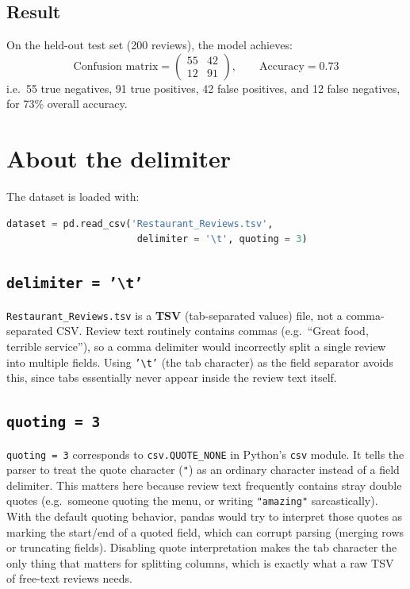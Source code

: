 \documentclass[11pt]{article}
\begin{document}
\subsection{Result}
On the held-out test set (200 reviews), the model achieves:
\[
  \text{Confusion matrix} =
  \begin{pmatrix} 55 & 42 \\ 12 & 91 \end{pmatrix},
  \qquad \text{Accuracy} = 0.73
\]
i.e.\ 55 true negatives, 91 true positives, 42 false positives, and
12 false negatives, for 73\% overall accuracy.

\section{About the delimiter}

The dataset is loaded with:
\begin{lstlisting}[language=Python]
dataset = pd.read_csv('Restaurant_Reviews.tsv',
                       delimiter = '\t', quoting = 3)
\end{lstlisting}

\subsection{\texttt{delimiter = '\textbackslash t'}}
\texttt{Restaurant\_Reviews.tsv} is a \textbf{TSV} (tab-separated
values) file, not a comma-separated CSV. Review text routinely
contains commas (e.g.\ ``Great food, terrible service''), so a
comma delimiter would incorrectly split a single review into multiple
fields. Using \texttt{'\textbackslash t'} (the tab character) as the
field separator avoids this, since tabs essentially never appear
inside the review text itself.

\subsection{\texttt{quoting = 3}}
\texttt{quoting = 3} corresponds to \texttt{csv.QUOTE\_NONE} in
Python's \texttt{csv} module. It tells the parser to treat the quote
character (\texttt{"}) as an ordinary character instead of a field
delimiter. This matters here because review text frequently contains
stray double quotes (e.g.\ someone quoting the menu, or writing
\texttt{"amazing"} sarcastically). With the default quoting behavior,
pandas would try to interpret those quotes as marking the start/end of
a quoted field, which can corrupt parsing (merging rows or truncating
fields). Disabling quote interpretation makes the tab character the
only thing that matters for splitting columns, which is exactly what a
raw TSV of free-text reviews needs.
\end{document}
